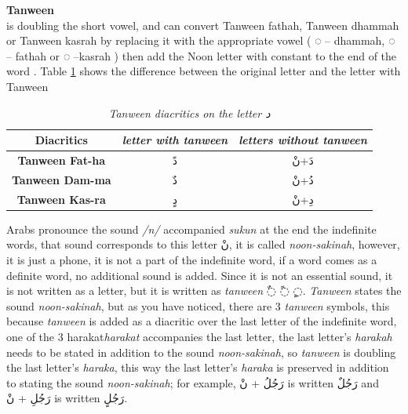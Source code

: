 \begin{definition}\label{def:tanween_definition}
  \textbf{Tanween} \hfill \\
  is doubling the short vowel, and can convert
Tanween fathah, Tanween dhammah or Tanween kasrah by
replacing it with the appropriate vowel ( ُ◌ – dhammah, َ◌ –
fathah or ِ◌ –kasrah ) then add the Noon letter with constant to the end of the word \cite{Alnagdawi2013}. Table \ref{tables:Tanween_dal}
shows the difference between the original letter and the letter with Tanween

\begin{table}[H]
	\centering
	\begin{tabular}{c c c}
		\toprule
		\textbf{\small{Diacritics}} & \small{\textit{letter with tanween }} & \small{\textit{letters without tanween}} \\
		\midrule

          \textbf{\small{Tanween Fat-ha}}  & \textarabic{دً} &  \textarabic{دَ+نْ}\\
          \textbf{\small{Tanween Dam-ma}}  & \textarabic{دٌ} &  \textarabic{دُ+نْ}\\
          \textbf{\small{Tanween Kas-ra}}  & \textarabic{دٍ} &  \textarabic{دِ+نْ}\\


		\bottomrule
	\end{tabular}
	\caption{\textit{Tanween diacritics on the letter  \textarabic{ د }}} \label{tables:Tanween_dal}
\end{table}


\end{definition}

 Arabs pronounce the sound \textit{/n/} accompanied \textit{sukun} at the end the indefinite words, that sound corresponds to this
letter \textarabic{نْ}, it is called \textit{noon-sakinah}, however, it is
just a phone, it is not a part of the indefinite word, if a word comes as a
definite word, no additional sound is added. Since it is not an essential sound,
it is not written as a letter, but it is written as  \textit{tanween}
\textarabic{◌ٌ ◌ً ◌ٍ}.
\textit{Tanween} states the sound \textit{noon-sakinah}, but as you have noticed,
there are 3 \textit{tanween} symbols, this because  \textit{tanween} is added as
a diacritic over the last letter of the indefinite word, one of the 3 harakat\textit{harakat} accompanies the last letter, the last letter's \textit{harakah}
needs to be stated in addition to the sound \textit{noon-sakinah}, so
\textit{tanween} is doubling the last letter's \textit{haraka}, this way the last
letter's \textit{haraka} is preserved in addition to stating the sound
\textit{noon-sakinah}; for example, \textarabic{رَجُلُ + نْ} is written
\textarabic{رَجُلٌ} and  \textarabic{رَجُلِ + نْ} is written \textarabic{رَجُلٍ}.



